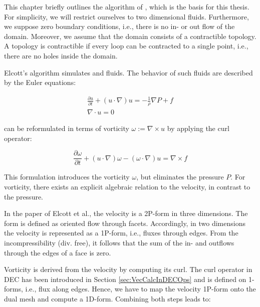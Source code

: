 \label{ch:simplicial}

This chapter briefly outlines the algorithm of , which is the basis for this thesis.
For simplicity, we will restrict ourselves to two dimensional fluids.
Furthermore, we suppose zero boundary conditions, i.e., there is no in- or out flow of the domain.
Moreover, we assume that the domain consists of a contractible topology.
A topology is contractible if every loop can be contracted to a single point, i.e., there are no holes inside the domain.

\label{sec:FluidEquations}
Elcott's algorithm simulates  and  fluids.
The behavior of such fluids are described by the Euler equations:

\begin{eqnarray}
\label{eq:EulerEquations}
\frac{\partial u}{ \partial t} + ( u \cdot \nabla) u = - \frac{1}{\rho} \nabla P + f \\
\nabla \cdot u = 0
\end{eqnarray}

 can be reformulated in terms of vorticity $\omega := \nabla \times u$ by applying the curl operator:

\begin{equation}
\label{eq:EulerVort}
\frac{\partial \omega}{\partial t} + ( u \cdot \nabla) \omega - ( \omega \cdot \nabla) u = \nabla \times f
\end{equation}

This formulation introduces the vorticity $\omega$, but eliminates the pressure $P$.
For vorticity, there exists an explicit algebraic relation to the velocity, in contrast to the pressure.

In the paper of Elcott et al., the velocity is a 2P-form in three dimensions.
The form is defined as oriented flow through facets.
Accordingly, in two dimensions the velocity is represented as a 1P-form, i.e., fluxes through edges.
From the incompressibility (div. free), it follows that the sum of the in- and outflows through the edges of a face is zero.

Vorticity is derived from the velocity by computing its curl.
The curl operator in DEC has been introduced in Section \ref{sec:VecCalcInDECOps} and is defined on 1-forms, i.e., flux along edges.
Hence, we have to map the velocity 1P-form onto the dual mesh and compute a 1D-form.
Combining both steps leads to:

